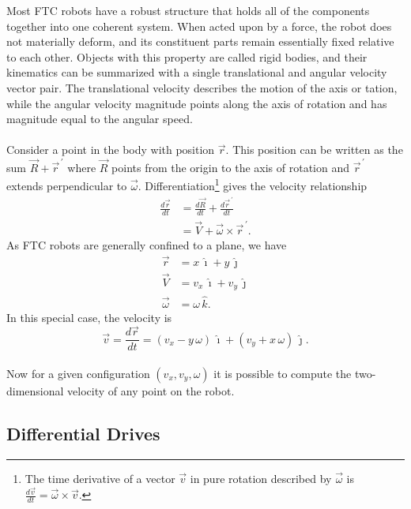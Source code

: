 \documentclass{article}
\newcommand{\cross}{\times}
\newcommand{\pvec}[1]{\vec{#1}^{\,\prime}}
\begin{document}
Most FTC robots have a robust structure that holds all of the components together into one coherent system. When acted upon by a force, the robot does not materially deform, and its constituent parts remain essentially fixed relative to each other. Objects with this property are called rigid bodies, and their kinematics can be summarized with a single translational and angular velocity vector pair. The translational velocity describes the motion of the axis or tation, while the angular velocity magnitude points along the axis of rotation and has magnitude equal to the angular speed.\\
\\
Consider a point in the body with position $\vec{r}$. This position can be written as the sum $\vec{R} + \pvec{r}$ where $\vec{R}$ points from the origin to the axis of rotation and $\pvec{r}$ extends perpendicular to $\vec{\omega}$. Differentiation\footnote{The time derivative of a vector $\vec{v}$ in pure rotation described by $\vec{\omega}$ is $\frac{d\vec{v}}{dt} = \vec{\omega} \cross \vec{v}$.} gives the velocity relationship
\begin{align*}
    \frac{d\vec{r}}{dt} &= \frac{d\vec{R}}{dt} + \frac{d\pvec{r}}{dt} \\
    &= \vec{V} + \vec{\omega} \cross \pvec{r}.
\end{align*}
As FTC robots are generally confined to a plane, we have
\begin{align*}
    \vec{r} &= x \, \hat{\imath} + y \, \hat{\jmath}\\
    \vec{V} &= v_x \, \hat{\imath} + v_y \, \hat{\jmath}\\
    \vec{\omega} &= \omega \, \hat{k}.
\end{align*}
In this special case, the velocity is
\[
    \vec{v} = \frac{d\vec{r}}{dt} = (v_x - y \, \omega) \, \hat{\imath} + (v_y + x \, \omega) \, \hat{\jmath}.
\]
\\
Now for a given configuration $(v_x, v_y, \omega)$ it is possible to compute the two-dimensional velocity of any point on the robot. 

\subsection{Differential Drives}
\end{document}
